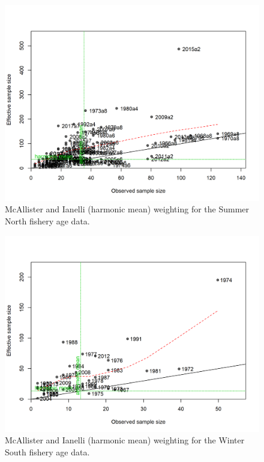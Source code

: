 \documentclass[12pt,]{article}
\begin{document}
\FloatBarrier

\begin{figure}
\centering
\includegraphics{r4ss/plots_mod1/comp_agefit_sampsize_flt2mkt2.png}
\caption{McAllister and Ianelli (harmonic mean) weighting for the Summer
North fishery age data. \label{fig:harm_mean_sn_age}}
\end{figure}

\FloatBarrier

\begin{figure}
\centering
\includegraphics{r4ss/plots_mod1/comp_agefit_sampsize_flt3mkt2.png}
\caption{McAllister and Ianelli (harmonic mean) weighting for the Winter
South fishery age data. \label{fig:harm_mean_ws_age}}
\end{figure}
\end{document}
